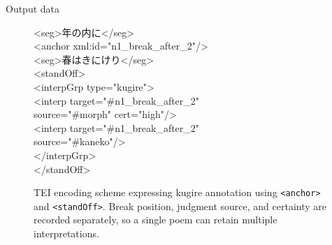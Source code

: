 \begin{block}{Output data}
\begin{figure}[H]\centering
\begin{tcolorbox}[colback=black!2, colframe=black!15, boxrule=0.5pt, arc=2pt,
  width=0.9\textwidth, left=8pt, right=8pt, top=6pt, bottom=6pt]
\ttfamily\small
\textcolor{xmlgray}{<}\textcolor{xmltag}{seg}\textcolor{xmlgray}{>}年の内に\textcolor{xmlgray}{</}\textcolor{xmltag}{seg}\textcolor{xmlgray}{>}\\[2pt]
\textcolor{xmlgray}{<}\textcolor{xmltag}{anchor} \textcolor{xmlattr}{xml:id}\textcolor{xmlgray}{=}"\textcolor{xmlval}{n1\_break\_after\_2}"\textcolor{xmlgray}{/>}\\[2pt]
\textcolor{xmlgray}{<}\textcolor{xmltag}{seg}\textcolor{xmlgray}{>}春はきにけり\textcolor{xmlgray}{</}\textcolor{xmltag}{seg}\textcolor{xmlgray}{>}\\[8pt]
\textcolor{xmlgray}{<}\textcolor{xmltag}{standOff}\textcolor{xmlgray}{>}\\[2pt]
\hspace*{1.5em}\textcolor{xmlgray}{<}\textcolor{xmltag}{interpGrp} \textcolor{xmlattr}{type}\textcolor{xmlgray}{=}"\textcolor{xmlval}{kugire}"\textcolor{xmlgray}{>}\\[2pt]
\hspace*{3em}\textcolor{xmlgray}{<}\textcolor{xmltag}{interp} \textcolor{xmlattr}{target}\textcolor{xmlgray}{=}"\textcolor{xmlval}{\#n1\_break\_after\_2}"\\[2pt]
\hspace*{5em}\textcolor{xmlattr}{source}\textcolor{xmlgray}{=}"\textcolor{xmlval}{\#morph}" \textcolor{xmlattr}{cert}\textcolor{xmlgray}{=}"\textcolor{xmlval}{high}"\textcolor{xmlgray}{/>}\\[2pt]
\hspace*{3em}\textcolor{xmlgray}{<}\textcolor{xmltag}{interp} \textcolor{xmlattr}{target}\textcolor{xmlgray}{=}"\textcolor{xmlval}{\#n1\_break\_after\_2}"\\[2pt]
\hspace*{5em}\textcolor{xmlattr}{source}\textcolor{xmlgray}{=}"\textcolor{xmlval}{\#kaneko}"\textcolor{xmlgray}{/>}\\[2pt]
\hspace*{1.5em}\textcolor{xmlgray}{</}\textcolor{xmltag}{interpGrp}\textcolor{xmlgray}{>}\\[2pt]
\textcolor{xmlgray}{</}\textcolor{xmltag}{standOff}\textcolor{xmlgray}{>}
\end{tcolorbox}
\setcounter{figure}{3}
\caption{TEI encoding scheme expressing kugire annotation using \texttt{<anchor>}
and \texttt{<standOff>}. Break position, judgment source, and certainty are recorded
separately, so a single poem can retain multiple interpretations.}
\end{figure}
\end{block}
